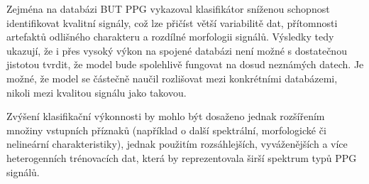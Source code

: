 Zejména na databázi BUT PPG vykazoval klasifikátor sníženou schopnost identifikovat kvalitní signály, což lze přičíst větší variabilitě dat, přítomnosti artefaktů odlišného charakteru a rozdílné morfologii signálů.
Výsledky tedy ukazují, že i přes vysoký výkon na spojené databázi není možné s dostatečnou jistotou tvrdit, že model bude spolehlivě fungovat na dosud neznámých datech.
Je možné, že model se částečně naučil rozlišovat mezi konkrétními databázemi, nikoli mezi kvalitou signálu jako takovou.

Zvýšení klasifikační výkonnosti by mohlo být dosaženo jednak rozšířením množiny vstupních příznaků (například o další spektrální, morfologické či nelineární charakteristiky), jednak použitím rozsáhlejších, vyváženějších a více heterogenních trénovacích dat, která by reprezentovala širší spektrum typů \acs{PPG} signálů.